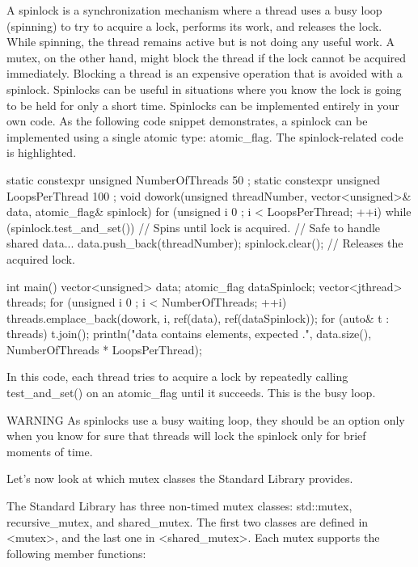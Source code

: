 A spinlock is a synchronization mechanism where a thread uses a busy loop (spinning) to try to acquire a lock, performs its work, and releases the lock. While spinning, the thread remains active but is not doing any useful work. A mutex, on the other hand, might block the thread if the lock cannot be acquired immediately. Blocking a thread is an expensive operation that is avoided with a spinlock. Spinlocks can be useful in situations where you know the lock is going to be held for only a short time. Spinlocks can be implemented entirely in your own code. As the following code snippet demonstrates, a spinlock can be implemented using a single atomic type: atomic\_flag. The spinlock-related code is highlighted.

\begin{cpp}
static constexpr unsigned NumberOfThreads { 50 };
static constexpr unsigned LoopsPerThread { 100 };
void dowork(unsigned threadNumber, vector<unsigned>& data, atomic_flag& spinlock)
{
    for (unsigned i { 0 }; i < LoopsPerThread; ++i) {
        while (spinlock.test_and_set()) { } // Spins until lock is acquired.
        // Safe to handle shared data...
        data.push_back(threadNumber);
        spinlock.clear(); // Releases the acquired lock.
    }
}

int main()
{
    vector<unsigned> data;
    atomic_flag dataSpinlock;
    vector<jthread> threads;
    for (unsigned i { 0 }; i < NumberOfThreads; ++i) {
        threads.emplace_back(dowork, i, ref(data), ref(dataSpinlock));
    }
    for (auto& t : threads) { t.join(); }
    println("data contains {} elements, expected {}.", data.size(),
        NumberOfThreads * LoopsPerThread);
}
\end{cpp}

In this code, each thread tries to acquire a lock by repeatedly calling test\_and\_set() on an atomic\_flag until it succeeds. This is the busy loop.

\begin{myWarning}{WARNING}
As spinlocks use a busy waiting loop, they should be an option only when you know for sure that threads will lock the spinlock only for brief moments of time.
\end{myWarning}

Let’s now look at which mutex classes the Standard Library provides.


The Standard Library has three non-timed mutex classes: std::mutex, recursive\_mutex, and shared\_mutex. The first two classes are defined in <mutex>, and the last one in <shared\_mutex>. Each mutex supports the following member functions:

